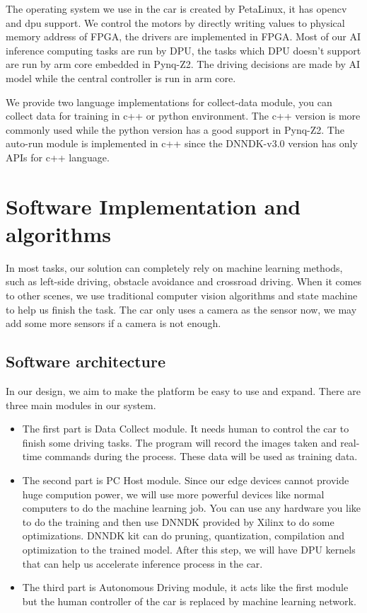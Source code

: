 \documentclass[conference]{IEEEtran}
\begin{document}
The operating system we use in the car is created by PetaLinux\cite{b9}, it has opencv and dpu support. We control the motors by directly writing values to physical memory address of FPGA, the drivers are implemented in FPGA. Most of our AI inference computing tasks are run by DPU, the tasks which DPU doesn't support are run by arm core embedded in Pynq-Z2. The driving decisions are made by AI model while the central controller is run in arm core.  

We provide two language implementations for collect-data module, you can collect data for training in c++ or python environment. The c++ version is more commonly used while the python version has a good support in Pynq-Z2. The auto-run module is implemented in c++ since the DNNDK-v3.0\cite{b10} version has only APIs for c++ language.

\section{Software Implementation and algorithms}

In most tasks, our solution can completely rely on machine learning methods, such as left-side driving, obstacle avoidance and crossroad driving. When it comes to other scenes, we use traditional computer vision algorithms and state machine to help us finish the task. The car only uses a camera as the sensor now, we may add some more sensors if a camera is not enough.

\subsection{Software architecture}\label{AA}

In our design, we aim to make the platform be easy to use and expand. There are three main modules in our system.

\begin{itemize}
\item The first part is Data Collect module. It needs human to control the car to finish some driving tasks. The program will record the images taken and real-time commands during the process. These data will be used as training data.
\item The second part is PC Host module. Since our edge devices cannot provide huge compution power, we will use more powerful devices like normal computers to do the machine learning job. You can use any hardware you like to do the training and then use DNNDK provided by Xilinx to do some optimizations. DNNDK kit can do pruning, quantization, compilation and optimization to the trained model. After this step, we will have DPU kernels that can help us accelerate inference process in the car.
\item The third part is Autonomous Driving module, it acts like the first module but the human controller of the car is replaced by machine learning network.
\end{itemize}
\end{document}
